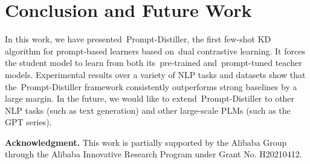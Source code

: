 \documentclass{article}
\begin{document}
\section{Conclusion and Future Work}

In this work, we have presented~{Prompt-Distiller}, the first few-shot KD algorithm for prompt-based learners based on~{dual contrastive learning}.
It forces the student model to learn from both its~{pre-trained} and~{prompt-tuned} teacher models.
Experimental results over a variety of NLP tasks and datasets show that the~{Prompt-Distiller} framework consistently outperforms strong baselines by a large margin.
In the future, we would like to extend~{Prompt-Distiller} to other NLP tasks (such as text generation) and other large-scale PLMs (such as the GPT series).

\bigskip
\bigskip

\noindent\textbf{Acknowledgment.} This work is partially supported by the Alibaba Group through the Alibaba Innovative Research Program under Grant No. H20210412.

\newpage



\end{document}
